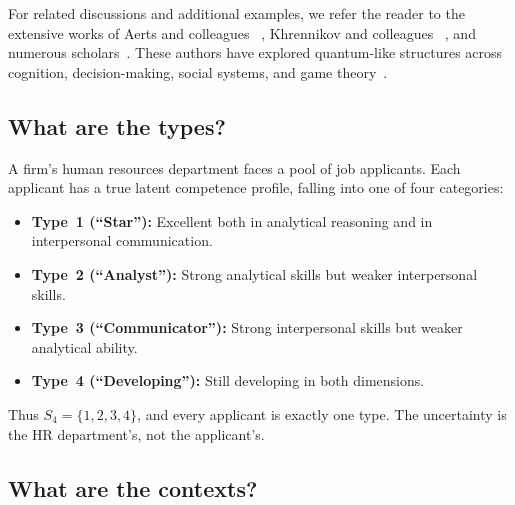\documentclass{article}
\begin{document}
For related discussions and additional examples, we refer the reader
to the extensive works of Aerts and colleagues
~\cite{aerts1995applications,aerts2005a,aerts2009experimental,
aerts2013concepts,aerts2022human,aerts2023thermodynamics,
aerts2024quantum,aerts2025quantum}, Khrennikov and colleagues
~\cite{Khrennikov2010,Khrennikov2009-decision,Haven2013-qss,
Khrennikov2015-modeling,Khrennikov2018-neuronal,
khrennikov2020social,Khrennikov2020-rationality}, and numerous
scholars~\cite{franco2009conjunction,lambert2009type,
aerts2010quantum,yukalov2010mathematical,lambert2012quantum,
atmanspacher2012order,yukalov2014conditions,Ashtiani2015-survey,
wendt2015quantum,Asano2015-adaptivity,orrell2016quantum,
yukalov2018quantitative,orrell2020bvalue,arioli2021quantum,
Meghdadi2022-biases,holtfort2023social,Aspalter2024,
Aspalter2024b,Aspalter2025}. These authors have explored
quantum-like structures across cognition, decision-making, social
systems, and game theory~\cite{eisert1999quantum,
sanzmartin2025mapping}.

\subsection{What are the types?}

A firm's human resources department faces a pool of job applicants.
Each applicant has a true latent competence profile, falling into one
of four categories:
\begin{itemize}
\item \textbf{Type~1 (``Star''):} Excellent both in analytical
reasoning and in interpersonal communication.
\item \textbf{Type~2 (``Analyst''):} Strong analytical skills but
weaker interpersonal skills.
\item \textbf{Type~3 (``Communicator''):} Strong interpersonal
skills but weaker analytical ability.
\item \textbf{Type~4 (``Developing''):} Still developing in both
dimensions.
\end{itemize}
Thus $S_4=\{1,2,3,4\}$, and every applicant is exactly one type.
The uncertainty is the HR department's, not the applicant's.

\subsection{What are the contexts?}
\end{document}
